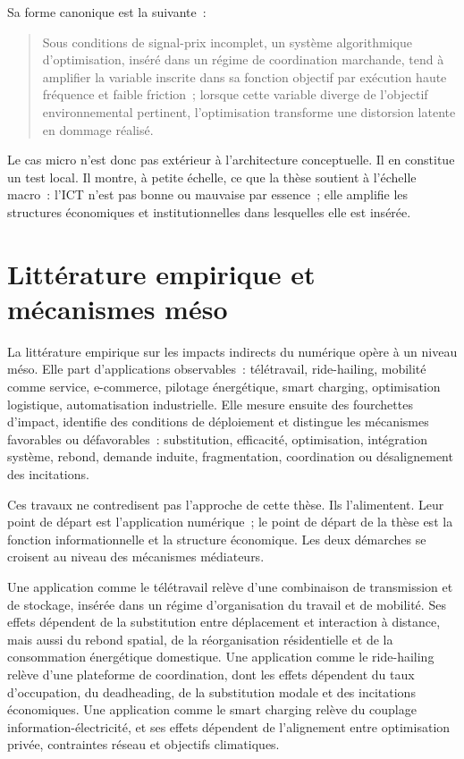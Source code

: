 Sa forme canonique est la suivante~:

\begin{quote}
Sous conditions de signal-prix incomplet, un système algorithmique d'optimisation, inséré dans un régime de coordination marchande, tend à amplifier la variable inscrite dans sa fonction objectif par exécution haute fréquence et faible friction~; lorsque cette variable diverge de l'objectif environnemental pertinent, l'optimisation transforme une distorsion latente en dommage réalisé.
\end{quote}

Le cas micro n'est donc pas extérieur à l'architecture conceptuelle. Il en constitue un test local. Il montre, à petite échelle, ce que la thèse soutient à l'échelle macro~: l'ICT n'est pas bonne ou mauvaise par essence~; elle amplifie les structures économiques et institutionnelles dans lesquelles elle est insérée.

\section{Littérature empirique et mécanismes méso}

La littérature empirique sur les impacts indirects du numérique opère à un niveau méso. Elle part d'applications observables~: télétravail, ride-hailing, mobilité comme service, e-commerce, pilotage énergétique, smart charging, optimisation logistique, automatisation industrielle. Elle mesure ensuite des fourchettes d'impact, identifie des conditions de déploiement et distingue les mécanismes favorables ou défavorables~: substitution, efficacité, optimisation, intégration système, rebond, demande induite, fragmentation, coordination ou désalignement des incitations.

Ces travaux ne contredisent pas l'approche de cette thèse. Ils l'alimentent. Leur point de départ est l'application numérique~; le point de départ de la thèse est la fonction informationnelle et la structure économique. Les deux démarches se croisent au niveau des mécanismes médiateurs.

Une application comme le télétravail relève d'une combinaison de transmission et de stockage, insérée dans un régime d'organisation du travail et de mobilité. Ses effets dépendent de la substitution entre déplacement et interaction à distance, mais aussi du rebond spatial, de la réorganisation résidentielle et de la consommation énergétique domestique. Une application comme le ride-hailing relève d'une plateforme de coordination, dont les effets dépendent du taux d'occupation, du deadheading, de la substitution modale et des incitations économiques. Une application comme le smart charging relève du couplage information-électricité, et ses effets dépendent de l'alignement entre optimisation privée, contraintes réseau et objectifs climatiques.

